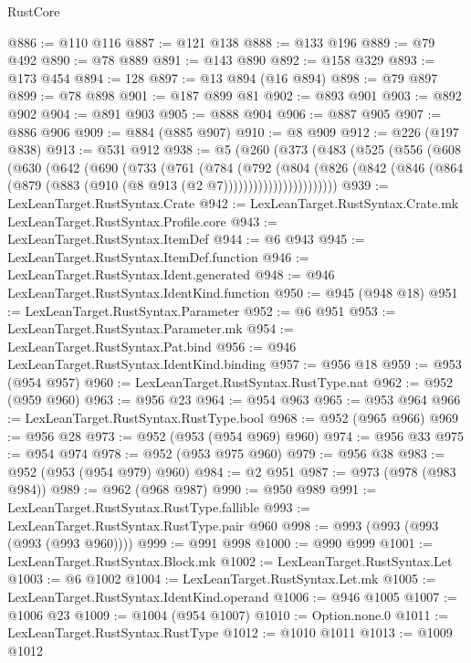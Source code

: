 \begin{lexlean}{RustCore}
\begin{coremodule}
@886 := @110 @116
@887 := @121 @138
@888 := @133 @196
@889 := @79 @492
@890 := @78 @889
@891 := @143 @890
@892 := @158 @329
@893 := @173 @454
@894 := 128
@897 := @13 @894 (@16 @894)
@898 := @79 @897
@899 := @78 @898
@901 := @187 @899 @81
@902 := @893 @901
@903 := @892 @902
@904 := @891 @903
@905 := @888 @904
@906 := @887 @905
@907 := @886 @906
@909 := @884 (@885 @907)
@910 := @8 @909
@912 := @226 (@197 @838)
@913 := @531 @912
@938 := @5
    (@260
      (@373
        (@483
          (@525
            (@556
              (@608
                (@630
                  (@642
                    (@690
                      (@733
                        (@761
                          (@784
                            (@792
                              (@804
                                (@826
                                  (@842
                                    (@846
                                      (@864 (@879 (@883 (@910 (@8 @913 (@2 @7)))))))))))))))))))))))
@939 := LexLeanTarget.RustSyntax.Crate
@942 := LexLeanTarget.RustSyntax.Crate.mk LexLeanTarget.RustSyntax.Profile.core
@943 := LexLeanTarget.RustSyntax.ItemDef
@944 := @6 @943
@945 := LexLeanTarget.RustSyntax.ItemDef.function
@946 := LexLeanTarget.RustSyntax.Ident.generated
@948 := @946 LexLeanTarget.RustSyntax.IdentKind.function
@950 := @945 (@948 @18)
@951 := LexLeanTarget.RustSyntax.Parameter
@952 := @6 @951
@953 := LexLeanTarget.RustSyntax.Parameter.mk
@954 := LexLeanTarget.RustSyntax.Pat.bind
@956 := @946 LexLeanTarget.RustSyntax.IdentKind.binding
@957 := @956 @18
@959 := @953 (@954 @957)
@960 := LexLeanTarget.RustSyntax.RustType.nat
@962 := @952 (@959 @960)
@963 := @956 @23
@964 := @954 @963
@965 := @953 @964
@966 := LexLeanTarget.RustSyntax.RustType.bool
@968 := @952 (@965 @966)
@969 := @956 @28
@973 := @952 (@953 (@954 @969) @960)
@974 := @956 @33
@975 := @954 @974
@978 := @952 (@953 @975 @960)
@979 := @956 @38
@983 := @952 (@953 (@954 @979) @960)
@984 := @2 @951
@987 := @973 (@978 (@983 @984))
@989 := @962 (@968 @987)
@990 := @950 @989
@991 := LexLeanTarget.RustSyntax.RustType.fallible
@993 := LexLeanTarget.RustSyntax.RustType.pair @960
@998 := @993 (@993 (@993 (@993 (@993 @960))))
@999 := @991 @998
@1000 := @990 @999
@1001 := LexLeanTarget.RustSyntax.Block.mk
@1002 := LexLeanTarget.RustSyntax.Let
@1003 := @6 @1002
@1004 := LexLeanTarget.RustSyntax.Let.mk
@1005 := LexLeanTarget.RustSyntax.IdentKind.operand
@1006 := @946 @1005
@1007 := @1006 @23
@1009 := @1004 (@954 @1007)
@1010 := Option.none.{0}
@1011 := LexLeanTarget.RustSyntax.RustType
@1012 := @1010 @1011
@1013 := @1009 @1012

\end{coremodule}
\end{lexlean}
